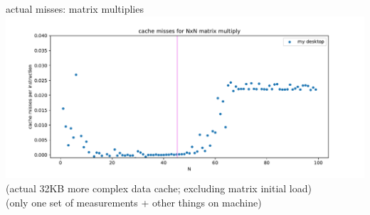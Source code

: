 \begin{frame}{actual misses: matrix multiplies}
\includegraphics[width=\textwidth]{../caching/mm-act}
(actual 32KB more complex data cache; excluding matrix initial load) \\
\small (only one set of measurements + other things on machine)
\end{frame}
